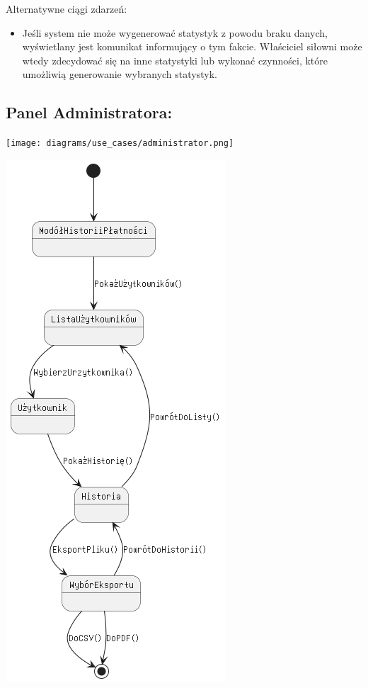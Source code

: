\documentclass[
]{article}
\providecommand{\tightlist}{%
  \setlength{\itemsep}{0pt}\setlength{\parskip}{0pt}}
\begin{document}
{Alternatywne ciągi zdarzeń:}

\begin{itemize}
\tightlist
\item
  {Jeśli system nie może wygenerować statystyk z powodu braku danych,
  wyświetlany jest komunikat informujący o tym fakcie. Właściciel
  siłowni może wtedy zdecydować się na inne statystyki lub wykonać
  czynności, które umożliwią generowanie wybranych statystyk.}
\end{itemize}

\hypertarget{h.sjnlhh288rjz}{%
\subsection{\texorpdfstring{{Panel
Administratora:}}{Panel Administratora:}}\label{h.sjnlhh288rjz}}

{\texttt{[image: diagrams/use\_cases/administrator.png]}}

{\includegraphics{diagrams/state/historia_płatności.png}}
\end{document}
